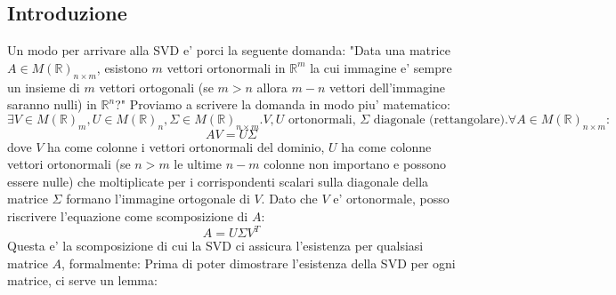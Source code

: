 \subsection{Introduzione}
Un modo per arrivare alla SVD e' porci la seguente domanda: "Data una matrice $ A \in M(\mathbb{R})_{n \times m} $, esistono $ m $ vettori ortonormali in $ \mathbb{R}^m $ la cui immagine e' sempre un insieme di $ m $ vettori ortogonali (se $ m > n $ allora $ m -n $ vettori dell'immagine saranno nulli) in $ \mathbb{R}^n $?" Proviamo a scrivere la domanda in modo piu' matematico:
\[
  \exists V \in M(\mathbb{R})_{m}, U \in M(\mathbb{R})_n, \Sigma \in M(\mathbb{R})_{n \times m}. V, U \text{ ortonormali, } \Sigma \text{ diagonale (rettangolare)}. \forall A \in M(\mathbb{R})_{n \times m}:
\]
\[
 AV = U\Sigma
\]
dove $ V $ ha come colonne i vettori ortonormali del dominio, $ U $ ha come colonne vettori ortonormali (se $ n > m $ le ultime $ n-m $ colonne non importano e possono essere nulle) che moltiplicate per i corrispondenti scalari sulla diagonale della matrice $ \Sigma $ formano l'immagine ortogonale di $ V $. Dato che $ V $ e' ortonormale, posso riscrivere l'equazione come scomposizione di $ A $:
\[
A = U\Sigma V^T
\]
Questa e' la scomposizione di cui la SVD ci assicura l'esistenza per qualsiasi matrice $ A $, formalmente:
Prima di poter dimostrare l'esistenza della SVD per ogni matrice, ci serve un lemma:

